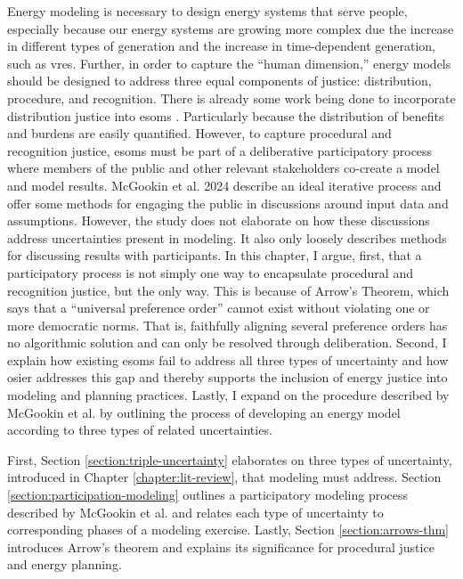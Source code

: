 Energy modeling is necessary to design energy systems that serve people,
especially because our energy systems are growing more complex due the increase
in different types of generation and the increase in time-dependent generation,
such as \acfp{vre}. Further, in order to capture the ``human dimension,'' energy
models should be designed to address three equal components of justice:
distribution, procedure, and recognition. There is already some work being done
to incorporate distribution justice into \acp{esom}
\cite{neumann_near-optimal_2021,jafino_enabling_2021}. Particularly because the
distribution of benefits and burdens are easily quantified. However, to capture
procedural and recognition justice, \acp{esom} must be part of a deliberative
participatory process where members of the public and other relevant
stakeholders co-create a model and model results. McGookin et al. 2024 describe
an ideal iterative process \cite{mcgookin_advancing_2024} and offer some methods
for engaging the public in discussions around input data and assumptions.
However, the study does not elaborate on how these discussions address
uncertainties present in modeling. It also only loosely describes methods for
discussing results with participants. In this chapter, I argue, first, that a
participatory process is not simply one way to encapsulate procedural and
recognition justice, but the only way. This is because of Arrow's Theorem, which
says that a ``universal preference order'' cannot exist without violating one or
more democratic norms. That is, faithfully aligning several preference orders
has no algorithmic solution and can only be resolved through deliberation.
Second, I explain how existing \acp{esom} fail to address all three types of
uncertainty and how \ac{osier} addresses this gap and thereby supports the
inclusion of energy justice into modeling and planning practices. Lastly, I
expand on the procedure described by McGookin et al.
\cite{mcgookin_advancing_2024} by outlining the process of developing an energy
model according to three types of related uncertainties.

First, Section \ref{section:triple-uncertainty} elaborates on three types of
uncertainty, introduced in Chapter \ref{chapter:lit-review}, that modeling must
address. Section \ref{section:participation-modeling} outlines a participatory
modeling process described by McGookin et al. \cite{mcgookin_advancing_2024} and
relates each type of uncertainty to corresponding phases of a modeling exercise.
Lastly, Section \ref{section:arrows-thm} introduces Arrow's theorem and explains
its significance for procedural justice and energy planning. 

